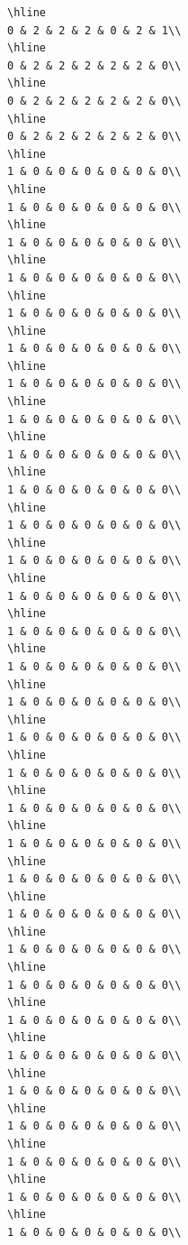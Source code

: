 \documentclass[
]{article}
\begin{document}
\begin{verbatim}
\hline
0 & 2 & 2 & 2 & 0 & 2 & 1\\
\hline
0 & 2 & 2 & 2 & 2 & 2 & 0\\
\hline
0 & 2 & 2 & 2 & 2 & 2 & 0\\
\hline
0 & 2 & 2 & 2 & 2 & 2 & 0\\
\hline
1 & 0 & 0 & 0 & 0 & 0 & 0\\
\hline
1 & 0 & 0 & 0 & 0 & 0 & 0\\
\hline
1 & 0 & 0 & 0 & 0 & 0 & 0\\
\hline
1 & 0 & 0 & 0 & 0 & 0 & 0\\
\hline
1 & 0 & 0 & 0 & 0 & 0 & 0\\
\hline
1 & 0 & 0 & 0 & 0 & 0 & 0\\
\hline
1 & 0 & 0 & 0 & 0 & 0 & 0\\
\hline
1 & 0 & 0 & 0 & 0 & 0 & 0\\
\hline
1 & 0 & 0 & 0 & 0 & 0 & 0\\
\hline
1 & 0 & 0 & 0 & 0 & 0 & 0\\
\hline
1 & 0 & 0 & 0 & 0 & 0 & 0\\
\hline
1 & 0 & 0 & 0 & 0 & 0 & 0\\
\hline
1 & 0 & 0 & 0 & 0 & 0 & 0\\
\hline
1 & 0 & 0 & 0 & 0 & 0 & 0\\
\hline
1 & 0 & 0 & 0 & 0 & 0 & 0\\
\hline
1 & 0 & 0 & 0 & 0 & 0 & 0\\
\hline
1 & 0 & 0 & 0 & 0 & 0 & 0\\
\hline
1 & 0 & 0 & 0 & 0 & 0 & 0\\
\hline
1 & 0 & 0 & 0 & 0 & 0 & 0\\
\hline
1 & 0 & 0 & 0 & 0 & 0 & 0\\
\hline
1 & 0 & 0 & 0 & 0 & 0 & 0\\
\hline
1 & 0 & 0 & 0 & 0 & 0 & 0\\
\hline
1 & 0 & 0 & 0 & 0 & 0 & 0\\
\hline
1 & 0 & 0 & 0 & 0 & 0 & 0\\
\hline
1 & 0 & 0 & 0 & 0 & 0 & 0\\
\hline
1 & 0 & 0 & 0 & 0 & 0 & 0\\
\hline
1 & 0 & 0 & 0 & 0 & 0 & 0\\
\hline
1 & 0 & 0 & 0 & 0 & 0 & 0\\
\hline
1 & 0 & 0 & 0 & 0 & 0 & 0\\
\hline
1 & 0 & 0 & 0 & 0 & 0 & 0\\
\hline
1 & 0 & 0 & 0 & 0 & 0 & 0\\

\end{verbatim}
\end{document}
